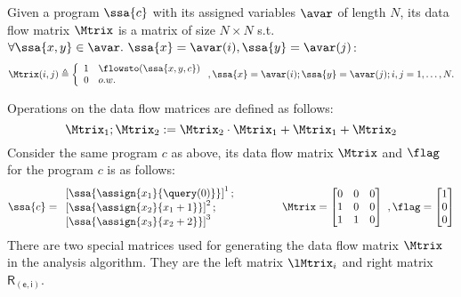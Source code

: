 %
%
\begin{defn}
Given a program  $\ssa{c}$ with its assigned variables $\avar$ of length $N$,
its data flow matrix $\Mtrix$ is a matrix of size $N \times N$ s.t.
$\forall \ssa{x, y} \in \avar. ~ \ssa{x} = \avar(i), \ssa{y} = \avar(j)$:
%
\[
\Mtrix(i, j) \triangleq
\left\{
\begin{array}{ll}
1	&	\flowsto(\ssa{x, y, c}) \\
0	& o.w.
\end{array}
\right.,
\ssa{x} = \avar(i); \ssa{y} = \avar(j); i, j = 1, \ldots, N .
\]
%
\end{defn}
%
Operations on the data flow matrices are defined as follows:
%
\begin{equation}
\Mtrix_1 ; \Mtrix_2 
:= \Mtrix_2 \cdot \Mtrix_1 + \Mtrix_1 + \Mtrix_2
\end{equation}
%
Consider the same program $c$ as above, its data flow matrix $\Mtrix$ and $\flag$ for the program $c$ is as follows:
$$
\ssa{c} = 
\begin{array}{l}
\left[\ssa{\assign {x_1} {\query(0)}}	\right]^1;
\\
\left[\ssa{\assign {x_2} {x_1 + 1}}		\right]^2;
\\
\left[\ssa{\assign {x_3} {x_2 + 2}}		\right]^3
\end{array}
~~~~~~~~~~~~
\Mtrix
=  \left[ 
\begin{matrix}
 0 & 0 & 0 \\
 1 & 0 & 0 \\
 1 & 1 & 0 \\
\end{matrix} \right] ~ , 
\flag = \left [ \begin{matrix}
1 \\
0 \\
0 \\
\end{matrix} \right ]
$$
%
There are two special matrices used for generating the data flow matrix $\Mtrix$ in the analysis algorithm. They are the left matrix $\lMtrix_i$ and right matrix $\mathsf{R_{(e, i)}}$.

